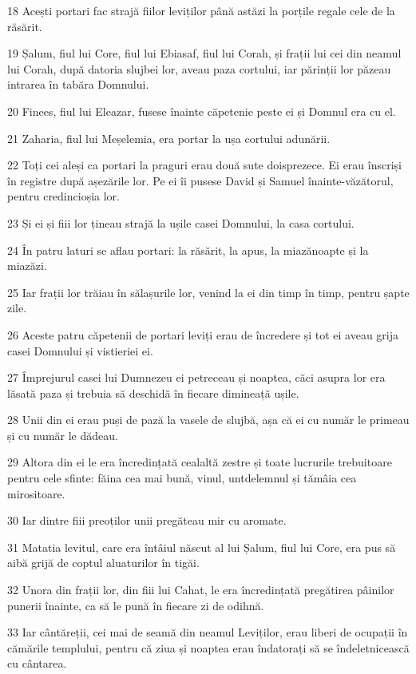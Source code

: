 \par 18 Acești portari fac strajă fiilor leviților până astăzi la porțile regale cele de la răsărit.
\par 19 Șalum, fiul lui Core, fiul lui Ebiasaf, fiul lui Corah, și frații lui cei din neamul lui Corah, după datoria slujbei lor, aveau paza cortului, iar părinții lor păzeau intrarea în tabăra Domnului.
\par 20 Finees, fiul lui Eleazar, fusese înainte căpetenie peste ei și Domnul era cu el.
\par 21 Zaharia, fiul lui Meșelemia, era portar la ușa cortului adunării.
\par 22 Toți cei aleși ca portari la praguri erau două sute doisprezece. Ei erau înscriși în registre după așezările lor. Pe ei îi pusese David și Samuel înainte-văzătorul, pentru credincioșia lor.
\par 23 Și ei și fiii lor țineau strajă la ușile casei Domnului, la casa cortului.
\par 24 În patru laturi se aflau portari: la răsărit, la apus, la miazănoapte și la miazăzi.
\par 25 Iar frații lor trăiau în sălașurile lor, venind la ei din timp în timp, pentru șapte zile.
\par 26 Aceste patru căpetenii de portari leviți erau de încredere și tot ei aveau grija casei Domnului și vistieriei ei.
\par 27 Împrejurul casei lui Dumnezeu ei petreceau și noaptea, căci asupra lor era lăsată paza și trebuia să deschidă în fiecare dimineață ușile.
\par 28 Unii din ei erau puși de pază la vasele de slujbă, așa că ei cu număr le primeau și cu număr le dădeau.
\par 29 Altora din ei le era încredințată cealaltă zestre și toate lucrurile trebuitoare pentru cele sfinte: făina cea mai bună, vinul, untdelemnul și tămâia cea mirositoare.
\par 30 Iar dintre fiii preoților unii pregăteau mir cu aromate.
\par 31 Matatia levitul, care era întâiul născut al lui Șalum, fiul lui Core, era pus să aibă grijă de coptul aluaturilor în tigăi.
\par 32 Unora din frații lor, din fiii lui Cahat, le era încredințată pregătirea pâinilor punerii înainte, ca să le pună în fiecare zi de odihnă.
\par 33 Iar cântăreții, cei mai de seamă din neamul Leviților, erau liberi de ocupații în cămările templului, pentru că ziua și noaptea erau îndatorați să se îndeletnicească cu cântarea.
